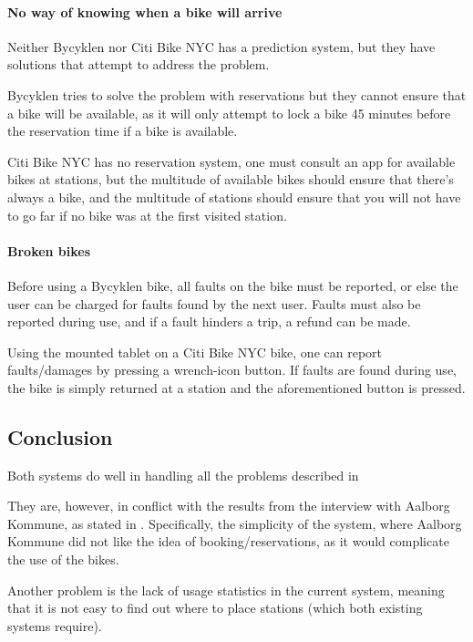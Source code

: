 \paragraph{No way of knowing when a bike will arrive}
Neither Bycyklen nor Citi Bike NYC has a prediction system, but they have solutions that attempt to address the problem.

Bycyklen tries to solve the problem with reservations but they cannot ensure that a bike will be available, as it will only attempt to lock a bike 45 minutes before the reservation time if a bike is available.

Citi Bike NYC has no reservation system, one must consult an app for available bikes at stations, but the multitude of  available bikes should ensure that there's always a bike, and the multitude of stations should ensure that you will not have to go far if no bike was at the first visited station.

\paragraph{Broken bikes}
Before using a Bycyklen bike, all faults on the bike must be reported, or else the user can be charged for faults found by the next user.
Faults must also be reported during use, and if a fault hinders a trip, a refund can be made.

Using the mounted tablet on a Citi Bike NYC bike, one can report faults/damages by pressing a wrench-icon button.
If faults are found during use, the bike is simply returned at a station and the aforementioned button is pressed.

\subsection{Conclusion}
Both systems do well in handling all the problems described in 

They are, however, in conflict with the results from the interview with Aalborg Kommune, as stated in .
Specifically, the simplicity of the system, where Aalborg Kommune did not like the idea of booking/reservations, as it would complicate the use of the bikes.

Another problem is the lack of usage statistics in the current system, meaning that it is not easy to find out where to place stations (which both existing systems require).

